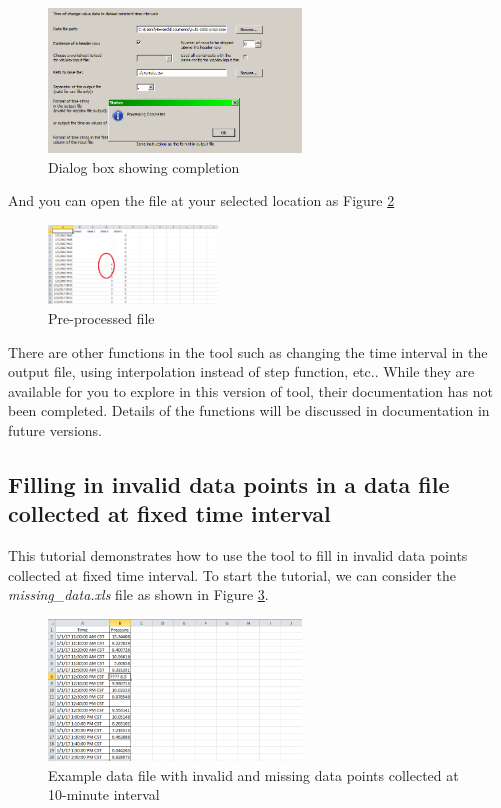 \documentclass[12pt,a4paper]{article}
\begin{document}
\begin{figure}[H]
\centering
\includegraphics[width=0.6\textwidth]{complete.png}
\caption{Dialog box showing completion}
\label{fig:complete}
\end{figure}

And you can open the file at your selected location as Figure \ref{fig:step}

\begin{figure}[H]
\centering
\includegraphics[width=0.4\textwidth]{step.png}
\caption{Pre-processed file}
\label{fig:step}
\end{figure}

There are other functions in the tool such as changing the time interval in the output file, using interpolation instead of step function, etc..
While they are available for you to explore in this version of tool, their documentation has not been completed.
Details of the functions will be discussed in documentation in future versions.

\subsection{Filling in invalid data points in a data file collected at fixed time interval}
\label{sec:tutorial_invalid}

This tutorial demonstrates how to use the tool to fill in invalid data points collected at fixed time interval.
To start the tutorial, we can consider the \emph{missing\_data.xls} file as shown in Figure \ref{fig:missing_data}.

\begin{figure}[H]
\centering
\includegraphics[width=0.6\textwidth]{missing_data.png}
\caption{Example data file with invalid and missing data points collected at 10-minute interval}
\label{fig:missing_data}
\end{figure}
\end{document}
